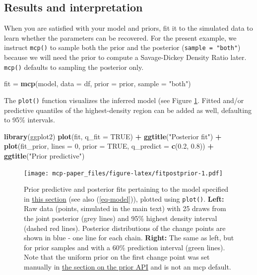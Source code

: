 \documentclass[
  american,
]{article}
\newenvironment{Shaded}{\begin{snugshade}}{\end{snugshade}}
\newcommand{\DataTypeTok}[1]{\textcolor[rgb]{0.13,0.29,0.53}{#1}}
\newcommand{\DecValTok}[1]{\textcolor[rgb]{0.00,0.00,0.81}{#1}}
\newcommand{\FloatTok}[1]{\textcolor[rgb]{0.00,0.00,0.81}{#1}}
\newcommand{\KeywordTok}[1]{\textcolor[rgb]{0.13,0.29,0.53}{\textbf{#1}}}
\newcommand{\NormalTok}[1]{#1}
\newcommand{\OperatorTok}[1]{\textcolor[rgb]{0.81,0.36,0.00}{\textbf{#1}}}
\newcommand{\OtherTok}[1]{\textcolor[rgb]{0.56,0.35,0.01}{#1}}
\newcommand{\StringTok}[1]{\textcolor[rgb]{0.31,0.60,0.02}{#1}}
\begin{document}
\hypertarget{results-and-interpretation}{%
\subsection{Results and interpretation}\label{results-and-interpretation}}

When you are satisfied with your model and priors, fit it to the simulated data to learn whether the parameters can be recovered. For the present example, we instruct \texttt{mcp()} to sample both the prior and the posterior (\texttt{sample\ =\ "both"}) because we will need the prior to compute a Savage-Dickey Density Ratio later. \texttt{mcp()} defaults to sampling the posterior only.

\begin{Shaded}
\begin{Highlighting}[]
\NormalTok{fit =}\StringTok{ }\KeywordTok{mcp}\NormalTok{(model, }\DataTypeTok{data =}\NormalTok{ df, }\DataTypeTok{prior =}\NormalTok{ prior, }\DataTypeTok{sample =} \StringTok{"both"}\NormalTok{)}
\end{Highlighting}
\end{Shaded}

The \texttt{plot()} function visualizes the inferred model (see Figure \ref{fig:fitpostprior}. Fitted and/or predictive quantiles of the highest-density region can be added as well, defaulting to 95\% intervals.



\begin{Shaded}
\begin{Highlighting}[]
\KeywordTok{library}\NormalTok{(ggplot2)}
\KeywordTok{plot}\NormalTok{(fit, }\DataTypeTok{q_fit =} \OtherTok{TRUE}\NormalTok{) }\OperatorTok{+}\StringTok{ }
\StringTok{  }\KeywordTok{ggtitle}\NormalTok{(}\StringTok{"Posterior fit"}\NormalTok{) }\OperatorTok{+}
\StringTok{  }
\KeywordTok{plot}\NormalTok{(fit_prior, }\DataTypeTok{lines =} \DecValTok{0}\NormalTok{, }\DataTypeTok{prior =} \OtherTok{TRUE}\NormalTok{, }\DataTypeTok{q_predict =} \KeywordTok{c}\NormalTok{(}\FloatTok{0.2}\NormalTok{, }\FloatTok{0.8}\NormalTok{)) }\OperatorTok{+}\StringTok{ }
\StringTok{  }\KeywordTok{ggtitle}\NormalTok{(}\StringTok{"Prior predictive"}\NormalTok{)}
\end{Highlighting}
\end{Shaded}

\begin{figure}
\centering
\texttt{[image: mcp-paper\_files/figure-latex/fitpostprior-1.pdf]}
\caption{\label{fig:fitpostprior}Prior predictive and posterior fits pertaining to the model specified in \protect\hyperlink{segments_api}{this section} (see also (\ref{eq-model})), plotted using \texttt{plot()}. \textbf{Left:} Raw data (points, simulated in the main text) with 25 draws from the joint posterior (grey lines) and 95\% highest density interval (dashed red lines). Posterior distributions of the change points are shown in blue - one line for each chain. \textbf{Right:} The same as left, but for prior samples and with a 60\% prediction interval (green lines). Note that the uniform prior on the first change point was set manually in \protect\hyperlink{priors_api}{the section on the prior API} and is not an mcp default.}
\end{figure}
\end{document}
